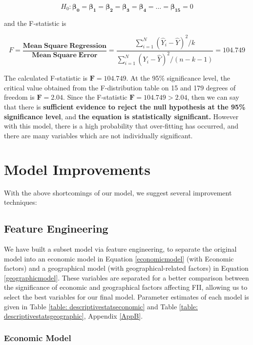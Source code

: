 \documentclass{article}
\begin{document}
\begin{equation}
    H_0: \bm{\beta_0} = \bm{\beta_1} = \bm{\beta_2} = \bm{\beta_3} = \bm{\beta_4} = \dots = \bm{\beta_{15}} = 0
\end{equation}

\noindent and the F-statistic is 

\begin{equation}\label{eqn:F-stat}
    F = \frac{\mathbf{Mean \; Square \; Regression}}{\mathbf{Mean \; Square \;  Error}} = \frac{{\sum_{i=1}^N (\hat{Y}_i - \hat{Y})^2} / k}{\sum_{i=1}^N (Y_i- \hat{Y})^2/(n-k-1)} = 104.749
\end{equation}

\noindent The calculated F-statistic is $\bm{F = 104.749}$. At the 95\% significance level, the critical value obtained from the F-distribution table on 15 and 179 degrees of freedom is $\bm{F = 2.04}$. Since the F-statistic $\bm{F = 104.749 > 2.04}$, then we can say that there is \textbf{sufficient evidence to reject the null hypothesis at the 95\% significance level}, and \textbf{the equation is statistically significant.} However with this model, there is a high probability that over-fitting has occurred, and there are many variables which are not individually significant. 

\section{Model Improvements}
With the above shortcomings of our model, we suggest several improvement techniques:

\subsection{Feature Engineering}\label{sec: feateng}
We have built a subset model via feature engineering, to separate the original model into an economic model in Equation \ref{economicmodel} (with Economic factors) and a geographical model (with geographical-related factors) in Equation \ref{geographicmodel}. These variables are separated for a better comparison between the significance of economic and geographical factors affecting FII, allowing us to select the best variables for our final model. Parameter estimates of each model is given in Table \ref{table: descriptivestatseconomic} and Table \ref{table: descriptivestatsgeographic}, Appendix \ref{AppB}.

\subsubsection{Economic Model}
\end{document}
